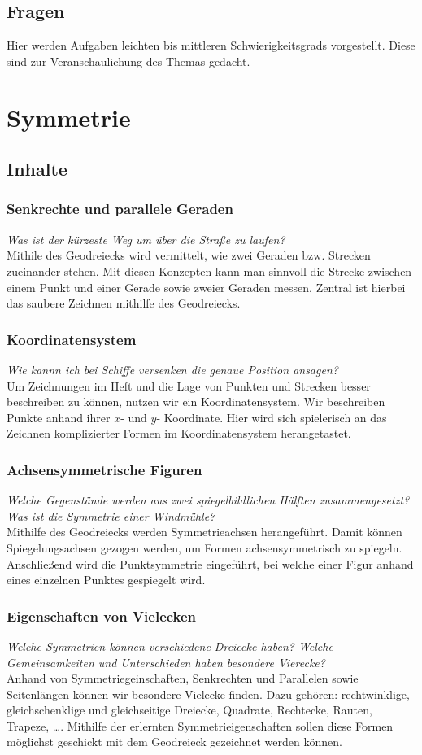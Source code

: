 \documentclass{article}
\begin{document}
\subsection{Fragen}
Hier werden Aufgaben leichten bis mittleren Schwierigkeitsgrads vorgestellt. Diese sind zur Veranschaulichung  des Themas gedacht. 
\newpage
\section{Symmetrie}
\subsection{Inhalte}
\subsubsection*{Senkrechte und parallele Geraden}
\textit{Was ist der kürzeste Weg um über die Straße zu laufen?}\\
Mithile des Geodreiecks wird vermittelt, wie zwei Geraden bzw. Strecken zueinander stehen. Mit diesen Konzepten kann man sinnvoll die Strecke zwischen einem Punkt und einer Gerade sowie zweier Geraden messen. Zentral ist hierbei das saubere Zeichnen mithilfe des Geodreiecks.
\subsubsection*{Koordinatensystem}
\textit{Wie kannn ich bei Schiffe versenken die genaue Position ansagen?}\\
Um Zeichnungen im Heft und die Lage von Punkten und Strecken besser beschreiben zu können, nutzen wir ein Koordinatensystem. Wir beschreiben Punkte anhand ihrer $x$- und $y$- Koordinate.
Hier wird sich  spielerisch an das Zeichnen komplizierter Formen im Koordinatensystem herangetastet.
\subsubsection*{Achsensymmetrische Figuren}
\textit{Welche Gegenstände werden aus zwei spiegelbildlichen Hälften zusammengesetzt? Was ist die Symmetrie einer Windmühle?}\\
Mithilfe des Geodreiecks werden Symmetrieachsen herangeführt. Damit können Spiegelungsachsen gezogen werden, um Formen achsensymmetrisch zu spiegeln. 
Anschließend wird die Punktsymmetrie eingeführt, bei welche einer Figur anhand eines einzelnen Punktes gespiegelt wird.
\subsubsection*{Eigenschaften von Vielecken}
\textit{Welche Symmetrien können verschiedene Dreiecke haben? Welche Gemeinsamkeiten und Unterschieden haben besondere Vierecke?}\\
Anhand von Symmetriegeinschaften, Senkrechten und Parallelen sowie Seitenlängen können wir besondere Vielecke finden. Dazu gehören: rechtwinklige, gleichschenklige und gleichseitige Dreiecke, Quadrate, Rechtecke, Rauten, Trapeze, \ldots. Mithilfe der erlernten Symmetrieigenschaften sollen diese Formen möglichst geschickt mit dem Geodreieck gezeichnet werden können.
\end{document}

